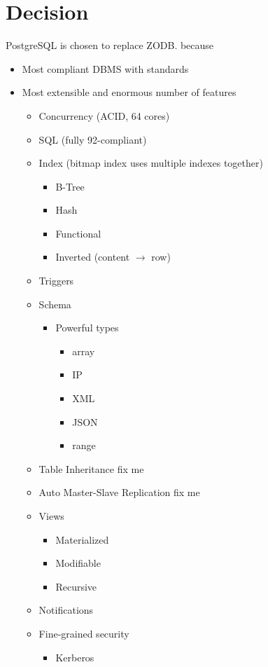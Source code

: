 \section{Decision}

PostgreSQL is chosen to replace ZODB. because
\begin{itemize}
  \item Most compliant DBMS with standards
  \item Most extensible and enormous number of features
  \begin{itemize}
    \item Concurrency (ACID, 64 cores)
	\item SQL (fully 92-compliant)
	\item Index (bitmap index uses multiple indexes together)
	\begin{itemize}
	  \item B-Tree
	  \item Hash
	  \item Functional
	  \item Inverted (content $\rightarrow$ row)
	\end{itemize}
	\item Triggers
	\item Schema
	\begin{itemize}
	  \item Powerful types
	  \begin{itemize}
	    \item array
	    \item IP
	    \item XML
	    \item JSON
	    \item range
	  \end{itemize}
	\end{itemize}
	\item Table Inheritance \textcolor{mygreen}{fix me}
	\item Auto Master-Slave Replication \textcolor{mygreen}{fix me}
	\item Views
	\begin{itemize}
	  \item Materialized
	  \item Modifiable
	  \item Recursive
	\end{itemize}
	\item Notifications
	\item Fine-grained security
	\begin{itemize}
	  \item Kerberos

\end{itemize}
\end{itemize}
\end{itemize}
